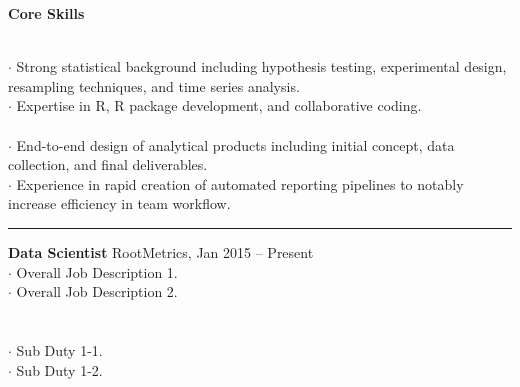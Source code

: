 \documentclass[letterpaper, onecolumn, oneside]{article}
\newcommand{\dotindent}{\hspace*{.25in}$\cdot$ }
\newcommand{\spaceindent}{\hspace*{0.1in}}
\begin{document}
\begin{flushleft}


\textbf{\large Core Skills}
\vspace*{0.05in}

\spaceindent {\bf Statistics and Analysis} \\
\dotindent Strong statistical background including hypothesis testing, experimental design, resampling techniques, and time series analysis. \\
\dotindent Expertise in R, R package development, and collaborative coding. %
~\\

\spaceindent {\bf Analytical Product Development} \\
\dotindent End-to-end design of analytical products including initial concept, data collection, and final deliverables. \\
\dotindent Experience in rapid creation of automated reporting pipelines to notably increase efficiency in team workflow.   \\

\textcolor{litegrey}{\rule{\textwidth}{.1pt}}


\vspace*{0.1in}



\textbf{\large Data Scientist} RootMetrics, Jan 2015 -- Present \\
\dotindent Overall Job Description 1. \\
\dotindent Overall Job Description 2.\\
~\\

\spaceindent {\bf Major Sub Duty 1} \\
\dotindent Sub Duty 1-1.\\
\dotindent Sub Duty 1-2.\\
~\\


\end{flushleft}
\end{document}
